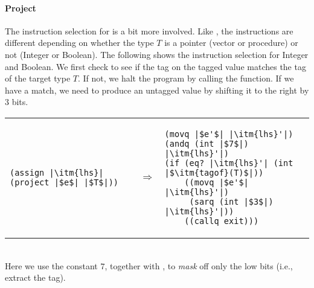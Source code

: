 \documentclass[11pt]{book}
\newcommand{\tagbits}{3} %
\newcommand{\tagmask}{7} %
\begin{document}
\paragraph{Project}


The instruction selection for  is a bit more involved.
Like , the instructions are different depending on whether
the type $T$ is a pointer (vector or procedure) or not (Integer or
Boolean). The following shows the instruction selection for Integer
and Boolean.  We first check to see if the tag on the tagged value
matches the tag of the target type $T$. If not, we halt the program by
calling the  function. If we have a match, we need to
produce an untagged value by shifting it to the right by $\tagbits$ bits.
%
\\
\begin{tabular}{lll}
\begin{minipage}{0.4\textwidth}
\begin{lstlisting}
(assign |\itm{lhs}| (project |$e$| |$T$|))
\end{lstlisting}
\end{minipage}
&
$\Rightarrow$
&
\begin{minipage}{0.5\textwidth}
\begin{lstlisting}
(movq |$e'$| |\itm{lhs}'|)
(andq (int |$\tagmask$|) |\itm{lhs}'|)
(if (eq? |\itm{lhs}'| (int |$\itm{tagof}(T)$|))
    ((movq |$e'$| |\itm{lhs}'|)
     (sarq (int |$\tagbits$|) |\itm{lhs}'|))
    ((callq exit)))
\end{lstlisting}
\end{minipage}
\end{tabular}  \\
%
Here we use the constant $\tagmask$, together with , to {\em mask} off
only the low bits (i.e., extract the tag).
\end{document}
